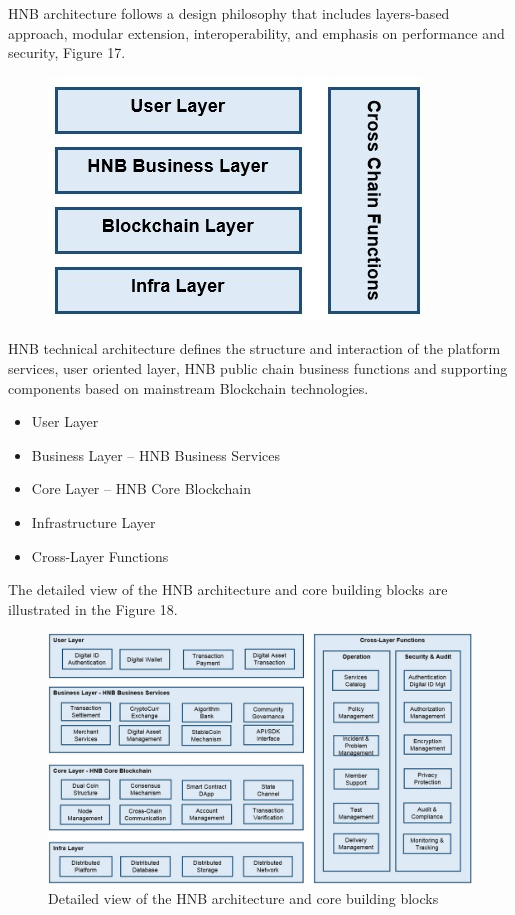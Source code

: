 \documentclass[fleqn,10pt]{SelfArx} %
\begin{document}
HNB architecture follows a design philosophy that includes layers-based approach, modular extension, interoperability, and emphasis on performance and security, Figure 17.

\begin{figure}[ht]\centering
\includegraphics[width=\linewidth]{18}
\caption{}
\label{fig:18}
\end{figure}

HNB technical architecture defines the structure and interaction of the platform services, user oriented layer, HNB public chain business functions and supporting components based on mainstream Blockchain technologies.

\begin{itemize}
\item{User Layer}
\item{Business Layer – HNB Business Services}
\item{Core Layer – HNB Core Blockchain}
\item{Infrastructure Layer}
\item{Cross-Layer Functions }
\end{itemize}



The detailed view of the HNB architecture and core building blocks are illustrated in the Figure 18.

\begin{figure}[ht]\centering %
\includegraphics[width=\linewidth]{19}
\caption{Detailed view of the HNB architecture and core building blocks}
\label{fig:19}
\end{figure}
\end{document}
